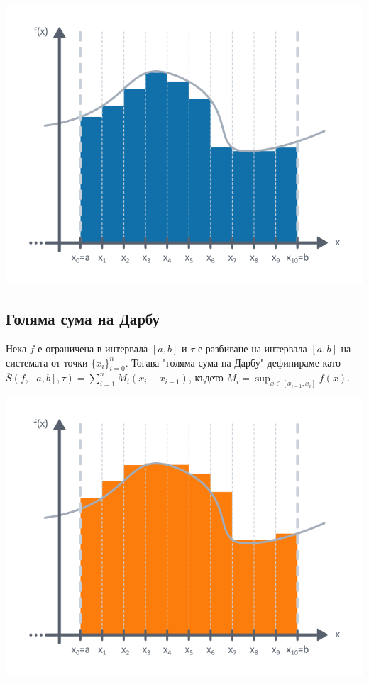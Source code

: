 \documentclass[fleqn,12pt]{article}
\begin{document}
\begin{flushleft}
\includegraphics{darboux_lower_sum.png}


\subsection{Голяма сума на Дарбу}
Нека $f$ е ограничена в интервала $[a,b]$ и $\tau$ е разбиване на интервала $[a,b]$ на системата от точки $\{x_i\}_{i=0}^{n}$.
Тогава "голяма сума на Дарбу" дефинираме като $\overline{S}(f,[a,b],\tau)=\sum_{i=1}^{n} M_i(x_i-x_{i-1})$, където $M_i=\sup_{x\in[x_{i-1},x_i]}f(x)$.

\includegraphics{darboux_higher_sums.png}


\end{flushleft}
\end{document}
